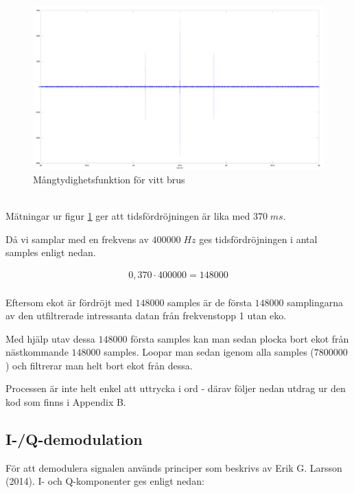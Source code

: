 \documentclass[10pt]{article}
\begin{document}
\begin{figure}[htp]
  \begin{center}
  \includegraphics[keepaspectratio=true,width=\linewidth]{xCorr.png}  %
  \end{center}
  \caption{Mångtydighetsfunktion för vitt brus} %
  \label{fig:xCorr}
\end{figure}
~\\
Mätningar ur figur \ref{fig:xCorr} ger att tidsfördröjningen är lika med $370\;ms$. 

Då vi samplar med en frekvens av $400 000\;Hz$ ges tidsfördröjningen i antal samples enligt nedan. 

\begin{gather}
0,370 \cdot 400 000 = 148 000
\label{equ:delaySamples}
\end{gather}
~\\
Eftersom ekot är fördröjt med $148 000$ samples är de första $148 000$ samplingarna av den utfiltrerade intressanta datan från frekvenstopp 1 utan eko. 

Med hjälp utav dessa $148 000$ första samples kan man sedan plocka bort ekot från nästkommande $148 000$ samples. Loopar man sedan igenom alla samples ($7 800 000$) och filtrerar man helt bort ekot från dessa. 

Processen är inte helt enkel att uttrycka i ord - därav följer nedan utdrag ur den kod som finns i Appendix B. 
~\\
\newpage
\subsection{I-/Q-demodulation}

För att demodulera signalen används principer som beskrivs av Erik G. Larsson (2014). I- och Q-komponenter ges enligt nedan: 
\end{document}

